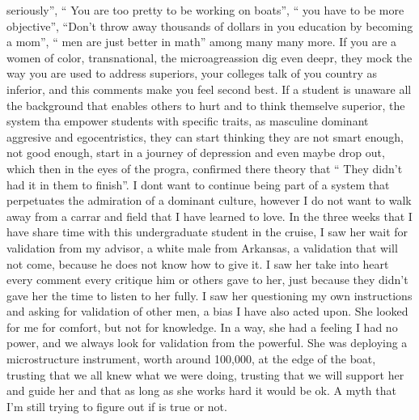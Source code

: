 \documentclass{tufte-handout}
\begin{document}
seriously”, “ You are too pretty to be working on boats”, “ you have to be more objective”, “Don’t throw away thousands of dollars in you education by becoming a mom”, “ men are just better in math” among many many more. If you are a women of color, transnational, the microagreassion dig even deepr, they mock the way you are used to address superiors, your colleges talk of you country as inferior, and this comments make you feel second best. If a student is unaware all the background that enables others to hurt and to think themselve superior, the system tha empower students with specific traits, as masculine dominant aggresive and egocentristics, they can start thinking they are not smart enough, not good enough, start in a journey of depression and even maybe drop out, which then in the eyes of the progra, confirmed there theory that “ They didn’t had it in them to finish”. I dont want to continue being part of a system that perpetuates the admiration of a dominant culture, however I do not want to walk away from a carrar and field that I have learned to love.  In the three weeks that I have share time with this undergraduate student in the cruise, I saw her wait for validation from my advisor, a white male from Arkansas, a validation that will not come, because he does not know how to give it. I saw her take into heart every comment every critique him or others gave to her, just because they didn't gave her the time to listen to her fully. I saw her questioning my own instructions and asking for validation of other men, a bias I have also acted upon. She looked for me for comfort, but not for knowledge. In a way, she had a feeling I had no power, and we always look for validation from the powerful. She was deploying a microstructure instrument, worth around 100,000, at the edge of the boat, trusting that we all knew what we were doing, trusting that we will support her and guide her and that as long as she works hard it would be ok. A myth that I’m still trying to figure out if is true or not. 





\end{document}
